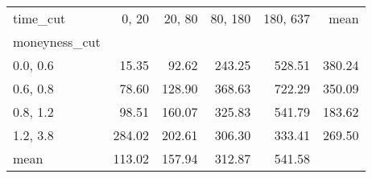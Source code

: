 \begin{tabular}{lrrrrr}
\toprule
time\_cut &  0, 20 &  20, 80 &  80, 180 &  180, 637 &   mean \\
moneyness\_cut &          &           &            &             &        \\
\midrule
0.0, 0.6    &    15.35 &     92.62 &     243.25 &      528.51 & 380.24 \\
0.6, 0.8    &    78.60 &    128.90 &     368.63 &      722.29 & 350.09 \\
0.8, 1.2    &    98.51 &    160.07 &     325.83 &      541.79 & 183.62 \\
1.2, 3.8    &   284.02 &    202.61 &     306.30 &      333.41 & 269.50 \\
mean          &   113.02 &    157.94 &     312.87 &      541.58 &        \\
\bottomrule
\end{tabular}
